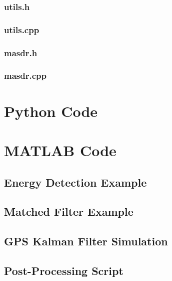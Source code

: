 \subsection{utils.h}

\subsection{utils.cpp}

\subsection{masdr.h}


\subsection{masdr.cpp}

\pagebreak

\chapter{Python Code}
\pagebreak

\chapter{MATLAB Code}

\section{Energy Detection Example}
\label{app:energy_detection}

\pagebreak

\section{Matched Filter Example}
\label{app:matched_filter}

\pagebreak

\section{GPS Kalman Filter Simulation}
\label{app:kf_sim}

\pagebreak

\section{Post-Processing Script}
\label{app:matlab_proc}

\pagebreak

